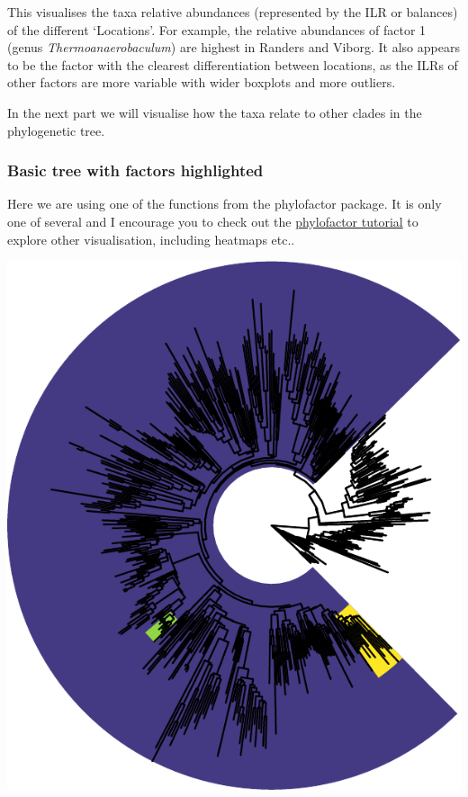 \documentclass[
]{book}
\newenvironment{Shaded}{\begin{snugshade}}{\end{snugshade}}
\newcommand{\DecValTok}[1]{\textcolor[rgb]{0.00,0.00,0.81}{#1}}
\newcommand{\FunctionTok}[1]{\textcolor[rgb]{0.00,0.00,0.00}{#1}}
\newcommand{\NormalTok}[1]{#1}
\newcommand{\OtherTok}[1]{\textcolor[rgb]{0.56,0.35,0.01}{#1}}
\newcommand{\SpecialCharTok}[1]{\textcolor[rgb]{0.00,0.00,0.00}{#1}}
\begin{document}
This visualises the taxa relative abundances (represented by the ILR or balances) of the different `Locations'. For example, the relative abundances of factor 1 (genus \emph{Thermoanaerobaculum}) are highest in Randers and Viborg. It also appears to be the factor with the clearest differentiation between locations, as the ILRs of other factors are more variable with wider boxplots and more outliers.

In the next part we will visualise how the taxa relate to other clades in the phylogenetic tree.

\hypertarget{basic-tree-with-factors-highlighted}{%
\subsubsection{Basic tree with factors highlighted}\label{basic-tree-with-factors-highlighted}}

Here we are using one of the functions from the phylofactor package. It is only one of several and I encourage you to check out the \href{https://docs.wixstatic.com/ugd/0119a1_099ae20df8424af9a38585dcebc0d45a.pdf}{phylofactor tutorial} to explore other visualisation, including heatmaps etc..

\begin{Shaded}
\end{Shaded}

\includegraphics{gitbook-demo_files/figure-latex/pfviz2-1.pdf}
\end{document}
